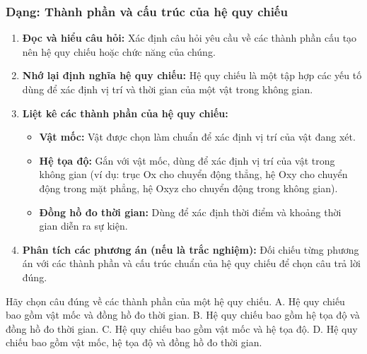 \subsubsection{Dạng: Thành phần và cấu trúc của hệ quy chiếu}
\begin{phuongphap}
\begin{enumerate}
    \item \textbf{Đọc và hiểu câu hỏi:} Xác định câu hỏi yêu cầu về các thành phần cấu tạo nên hệ quy chiếu hoặc chức năng của chúng.
    \item \textbf{Nhớ lại định nghĩa hệ quy chiếu:} Hệ quy chiếu là một tập hợp các yếu tố dùng để xác định vị trí và thời gian của một vật trong không gian.
    \item \textbf{Liệt kê các thành phần của hệ quy chiếu:}
    \begin{itemize}
        \item \textbf{Vật mốc:} Vật được chọn làm chuẩn để xác định vị trí của vật đang xét.
        \item \textbf{Hệ tọa độ:} Gắn với vật mốc, dùng để xác định vị trí của vật trong không gian (ví dụ: trục Ox cho chuyển động thẳng, hệ Oxy cho chuyển động trong mặt phẳng, hệ Oxyz cho chuyển động trong không gian).
        \item \textbf{Đồng hồ đo thời gian:} Dùng để xác định thời điểm và khoảng thời gian diễn ra sự kiện.
    \end{itemize}
    \item \textbf{Phân tích các phương án (nếu là trắc nghiệm):} Đối chiếu từng phương án với các thành phần và cấu trúc chuẩn của hệ quy chiếu để chọn câu trả lời đúng.
\end{enumerate}
\end{phuongphap}
\begin{vidumau}
Hãy chọn câu đúng về các thành phần của một hệ quy chiếu.
\choice
{A. Hệ quy chiếu bao gồm vật mốc và đồng hồ đo thời gian.}
{B. Hệ quy chiếu bao gồm hệ tọa độ và đồng hồ đo thời gian.}
{C. Hệ quy chiếu bao gồm vật mốc và hệ tọa độ.}
{\True D. Hệ quy chiếu bao gồm vật mốc, hệ tọa độ và đồng hồ đo thời gian.}
\end{vidumau}

